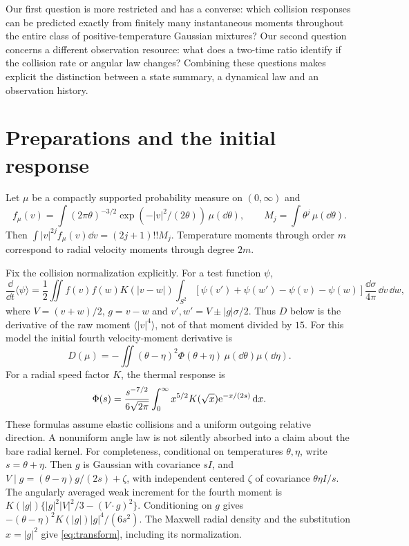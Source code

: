 \documentclass[11pt]{article}
\begin{document}
Our first question is more restricted and has a converse: which collision
responses can be predicted exactly from finitely many instantaneous
moments throughout the entire class of positive-temperature Gaussian
mixtures? Our second question concerns a different observation resource:
what does a two-time ratio identify if the collision rate or angular law
changes? Combining these questions makes explicit the distinction between
a state summary, a dynamical law and an observation history.

\section{Preparations and the initial response}
Let $\mu$ be a compactly supported probability measure on $(0,\infty)$ and
\[
 f_\mu(v)=\int (2\pi\theta)^{-3/2}
       \exp(-|v|^2/(2\theta))\,\mu(\dd\theta),\qquad
 M_j=\int\theta^j\,\mu(\dd\theta).
\]
Then $\int|v|^{2j}f_\mu(v)\dd v=(2j+1)!!M_j$.
Temperature moments through order $m$ correspond to radial velocity moments
through degree $2m$.

Fix the collision normalization explicitly. For a test function $\psi$,
\[
 \frac{\dd}{\dd t}\langle\psi\rangle
 =\frac12\iint f(v)f(w)K(|v-w|)
   \int_{S^2}[\psi(v')+\psi(w')-\psi(v)-\psi(w)]
              \frac{\dd\sigma}{4\pi}\,\dd v\,\dd w ,
\]
where $V=(v+w)/2$, $g=v-w$ and $v',w'=V\pm|g|\sigma/2$.
Thus $D$ below is the derivative of the raw moment
$\langle|v|^4\rangle$, not of that moment divided by $15$.
For this model the initial fourth velocity-moment derivative is
\begin{equation}\label{eq:D}
 D(\mu)=-\iint (\theta-\eta)^2\Phi(\theta+\eta)
                        \,\mu(\dd\theta)\mu(\dd\eta).
\end{equation}
For a radial speed factor $K$, the thermal response is
\begin{equation}\label{eq:transform}
 \Phi(s)=\frac{s^{-7/2}}{6\sqrt{2\pi}}
 \int_0^\infty x^{5/2}K(\sqrt{x})\mathrm e^{-x/(2s)}\,\mathrm d x .
\end{equation}
These formulas assume elastic collisions and a uniform outgoing relative
direction. A nonuniform angle law is not silently absorbed into a claim
about the bare radial kernel.
For completeness, conditional on temperatures $\theta,\eta$, write
$s=\theta+\eta$. Then $g$ is Gaussian with covariance $sI$, and
$V\mid g=(\theta-\eta)g/(2s)+\zeta$, with independent centered
$\zeta$ of covariance $\theta\eta I/s$.
The angularly averaged weak increment for the fourth moment is
$K(|g|)\{ |g|^2|V|^2/3-(V\cdot g)^2\}$.
Conditioning on $g$ gives
$-(\theta-\eta)^2 K(|g|)|g|^4/(6s^2)$.
The Maxwell radial density and the substitution $x=|g|^2$ give
\eqref{eq:transform}, including its normalization.
\end{document}
